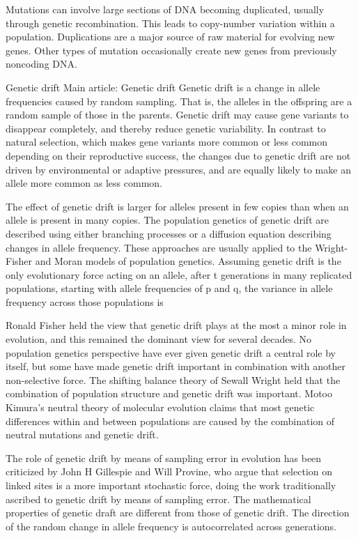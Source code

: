 Mutations can involve large sections of DNA becoming duplicated, usually through genetic recombination. This leads to copy-number variation within a population. Duplications are a major source of raw material for evolving new genes. Other types of mutation occasionally create new genes from previously noncoding DNA.

Genetic drift
Main article: Genetic drift
Genetic drift is a change in allele frequencies caused by random sampling. That is, the alleles in the offspring are a random sample of those in the parents. Genetic drift may cause gene variants to disappear completely, and thereby reduce genetic variability. In contrast to natural selection, which makes gene variants more common or less common depending on their reproductive success, the changes due to genetic drift are not driven by environmental or adaptive pressures, and are equally likely to make an allele more common as less common.

The effect of genetic drift is larger for alleles present in few copies than when an allele is present in many copies. The population genetics of genetic drift are described using either branching processes or a diffusion equation describing changes in allele frequency. These approaches are usually applied to the Wright-Fisher and Moran models of population genetics. Assuming genetic drift is the only evolutionary force acting on an allele, after t generations in many replicated populations, starting with allele frequencies of p and q, the variance in allele frequency across those populations is

Ronald Fisher held the view that genetic drift plays at the most a minor role in evolution, and this remained the dominant view for several decades. No population genetics perspective have ever given genetic drift a central role by itself, but some have made genetic drift important in combination with another non-selective force. The shifting balance theory of Sewall Wright held that the combination of population structure and genetic drift was important. Motoo Kimura's neutral theory of molecular evolution claims that most genetic differences within and between populations are caused by the combination of neutral mutations and genetic drift.

The role of genetic drift by means of sampling error in evolution has been criticized by John H Gillespie and Will Provine, who argue that selection on linked sites is a more important stochastic force, doing the work traditionally ascribed to genetic drift by means of sampling error. The mathematical properties of genetic draft are different from those of genetic drift. The direction of the random change in allele frequency is autocorrelated across generations.

